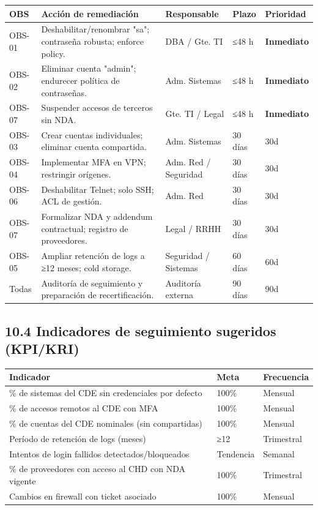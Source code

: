 \documentclass[11pt,a4paper]{article}
\begin{document}
\begin{tabularx}{\textwidth}{P{2cm}P{2.5cm}P{2.5cm}P{2cm}L}
\toprule
\textbf{OBS} & \textbf{Acción de remediación} & \textbf{Responsable} & \textbf{Plazo} & \textbf{Prioridad} \\
\midrule
OBS-01 & Deshabilitar/renombrar "sa"; contraseña robusta; enforce policy. & DBA / Gte. TI & ≤48 h & \textbf{Inmediato} \\
OBS-02 & Eliminar cuenta "admin"; endurecer política de contraseñas. & Adm. Sistemas & ≤48 h & \textbf{Inmediato} \\
OBS-07 & Suspender accesos de terceros sin NDA. & Gte. TI / Legal & ≤48 h & \textbf{Inmediato} \\
OBS-03 & Crear cuentas individuales; eliminar cuenta compartida. & Adm. Sistemas & 30 días & 30d \\
OBS-04 & Implementar MFA en VPN; restringir orígenes. & Adm. Red / Seguridad & 30 días & 30d \\
OBS-06 & Deshabilitar Telnet; solo SSH; ACL de gestión. & Adm. Red & 30 días & 30d \\
OBS-07 & Formalizar NDA y addendum contractual; registro de proveedores. & Legal / RRHH & 30 días & 30d \\
OBS-05 & Ampliar retención de logs a ≥12 meses; cold storage. & Seguridad / Sistemas & 60 días & 60d \\
Todas & Auditoría de seguimiento y preparación de recertificación. & Auditoría externa & 90 días & 90d \\
\bottomrule
\end{tabularx}

\subsection{10.4 Indicadores de seguimiento sugeridos (KPI/KRI)}

\begin{tabularx}{\textwidth}{P{3cm}P{4cm}L}
\toprule
\textbf{Indicador} & \textbf{Meta} & \textbf{Frecuencia} \\
\midrule
\% de sistemas del CDE sin credenciales por defecto & 100\% & Mensual \\
\% de accesos remotos al CDE con MFA & 100\% & Mensual \\
\% de cuentas del CDE nominales (sin compartidas) & 100\% & Mensual \\
Período de retención de logs (meses) & ≥12 & Trimestral \\
Intentos de login fallidos detectados/bloqueados & Tendencia & Semanal \\
\% de proveedores con acceso al CHD con NDA vigente & 100\% & Trimestral \\
Cambios en firewall con ticket asociado & 100\% & Mensual \\
\bottomrule
\end{tabularx}
\end{document}
